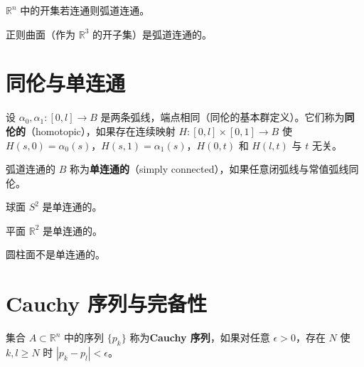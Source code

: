 \begin{Remark}
\begin{Proposition}\label{prop:open-arcwise-connected}
$\mathbb{R}^n$ 中的开集若连通则弧道连通。
\end{Proposition}

\begin{Corollary}
正则曲面（作为 $\mathbb{R}^3$ 的开子集）是弧道连通的。
\end{Corollary}

\section{同伦与单连通}

\begin{Definition}\label{def:homotopy}
设 $\alpha_0, \alpha_1: [0,l] \to B$ 是两条弧线，端点相同（同伦的基本群定义）。它们称为\textbf{同伦的}（homotopic），如果存在连续映射 $H: [0,l]\times[0,1] \to B$ 使 $H(s,0)=\alpha_0(s)$，$H(s,1)=\alpha_1(s)$，$H(0,t)$ 和 $H(l,t)$ 与 $t$ 无关。
\end{Definition}

\begin{Definition}\label{def:simply-connected-appendix}
弧道连通的 $B$ 称为\textbf{单连通的}（simply connected），如果任意闭弧线与常值弧线同伦。
\end{Definition}

\begin{Proposition}\label{prop:sphere-simply-connected}
球面 $S^2$ 是单连通的。
\end{Proposition}

\begin{Proposition}\label{prop:plane-simply-connected}
平面 $\mathbb{R}^2$ 是单连通的。
\end{Proposition}

\begin{Proposition}\label{prop:cylinder-not-simply-connected}
圆柱面不是单连通的。
\end{Proposition}

\section{Cauchy 序列与完备性}

\begin{Definition}\label{def:cauchy-sequence}
集合 $A \subset \mathbb{R}^n$ 中的序列 $\{p_k\}$ 称为\textbf{Cauchy 序列}，如果对任意 $\epsilon>0$，存在 $N$ 使 $k,l \geq N$ 时 $|p_k - p_l| < \epsilon$。
\end{Definition}


\end{Remark}
